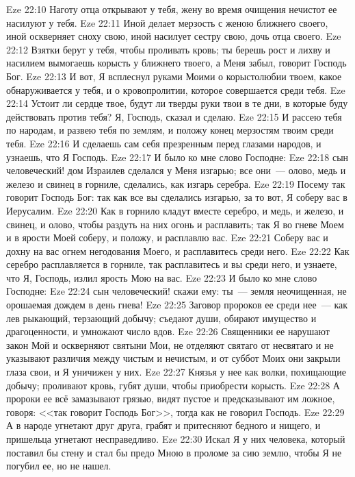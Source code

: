 \vs Eze 22:10 Наготу отца открывают у тебя, жену во время очищения нечистот ее насилуют у тебя.
\vs Eze 22:11 Иной делает мерзость с женою ближнего своего, иной оскверняет сноху свою, иной насилует сестру свою, дочь отца своего.
\vs Eze 22:12 Взятки берут у тебя, чтобы проливать кровь; ты берешь рост и лихву и насилием вымогаешь корысть у ближнего твоего, а Меня забыл, говорит Господь Бог.
\vs Eze 22:13 И вот, Я всплеснул руками Моими о корыстолюбии твоем, какое обнаруживается у тебя, и о кровопролитии, которое совершается среди тебя.
\vs Eze 22:14 Устоит ли сердце твое, будут ли тверды руки твои в те дни, в которые буду действовать против тебя? Я, Господь, сказал и сделаю.
\vs Eze 22:15 И рассею тебя по народам, и развею тебя по землям, и положу конец мерзостям твоим среди тебя.
\vs Eze 22:16 И сделаешь сам себя презренным перед глазами народов, и узнаешь, что Я Господь.
\vs Eze 22:17 И было ко мне слово Господне:
\vs Eze 22:18 сын человеческий! дом Израилев сделался у Меня изгарью; все они~--- олово, медь и железо и свинец в горниле, сделались, как изгарь серебра.
\vs Eze 22:19 Посему так говорит Господь Бог: так как все вы сделались изгарью, за то вот, Я соберу вас в Иерусалим.
\vs Eze 22:20 Как в горнило кладут вместе серебро, и медь, и железо, и свинец, и олово, чтобы раздуть на них огонь и расплавить; так Я во гневе Моем и в ярости Моей соберу, и положу, и расплавлю вас.
\vs Eze 22:21 Соберу вас и дохну на вас огнем негодования Моего, и расплавитесь среди него.
\vs Eze 22:22 Как серебро расплавляется в горниле, так расплавитесь и вы среди него, и узнаете, что Я, Господь, излил ярость Мою на вас.
\vs Eze 22:23 И было ко мне слово Господне:
\vs Eze 22:24 сын человеческий! скажи ему: ты~--- земля неочищенная, не орошаемая дождем в день гнева!
\vs Eze 22:25 Заговор пророков ее среди нее~--- как лев рыкающий, терзающий добычу; съедают души, обирают имущество и драгоценности, и умножают число вдов.
\vs Eze 22:26 Священники ее нарушают закон Мой и оскверняют святыни Мои, не отделяют святаго от несвятаго и не указывают различия между чистым и нечистым, и от суббот Моих они закрыли глаза свои, и Я уничижен у них.
\vs Eze 22:27 Князья у нее как волки, похищающие добычу; проливают кровь, губят души, чтобы приобрести корысть.
\vs Eze 22:28 А пророки ее всё замазывают грязью, видят пустое и предсказывают им ложное, говоря: <<так говорит Господь Бог>>, тогда как не говорил Господь.
\vs Eze 22:29 А в народе угнетают друг друга, грабят и притесняют бедного и нищего, и пришельца угнетают несправедливо.
\vs Eze 22:30 Искал Я у них человека, который поставил бы стену и стал бы предо Мною в проломе за сию землю, чтобы Я не погубил ее, но не нашел.
